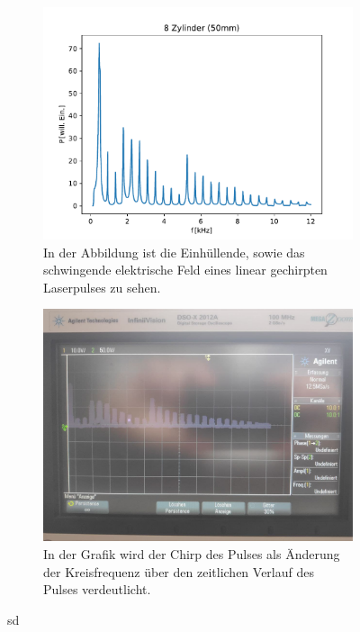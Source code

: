 \begin{figure}
            \centering
            \begin{subfigure}[b]{0.45\textwidth}
                \centering
                \includegraphics[scale=0.4]{./pictures/8_Zylinder_50mm.pdf}
                \caption{In der Abbildung ist die Einhüllende, sowie das schwingende elektrische Feld eines linear gechirpten Laserpulses zu sehen.}
                \label{fig:e_feld_chirp}
            \end{subfigure}
            \hfill
            \centering
            \begin{subfigure}[b]{0.45\textwidth}
                \centering
                \includegraphics[scale=0.13]{./pictures/8_Zylinder.jpg}
                \caption{In der Grafik wird der Chirp des Pulses als Änderung der Kreisfrequenz über den zeitlichen Verlauf des Pulses verdeutlicht.}
                \label{fig:chirp}
            \end{subfigure}
            \caption{sd}
            \label{fig:pre_vgl}
        \end{figure}
    \FloatBarrier

